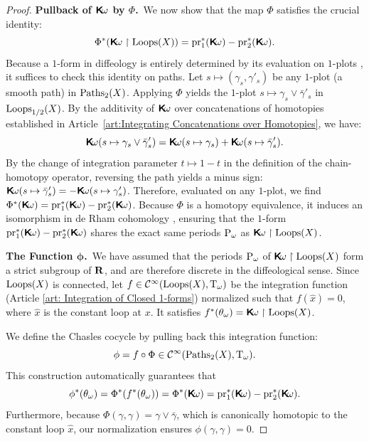 \documentclass[10pt,reqno,letterpaper,twoside]{amsbook}
\begin{document}
\begin{proof}
    \textbf{Pullback of $\boldsymbol{\mathsf{K}}\!\omega$ by $\Phi$.}~We now show that the map $\Phi$ satisfies the crucial identity:
    \[
      \Phi^*(\Komega \restriction \Loops(X)) = \pr_1^*(\Komega) - \pr_2^*(\Komega).
      \]
    Because a $1$-form in diffeology is entirely determined by its evaluation on $1$-plots \cite[]{PIZ13},
    it suffices to check this identity on paths.
    Let $s \mapsto (\gamma_s, \gamma'_s)$ be any $1$-plot (a smooth path) in $\operatorname{Paths}_2(X)$.
    Applying $\Phi$ yields the $1$-plot $s \mapsto \gamma_s \vee \bar\gamma'_s$ in $\operatorname{Loops}_{1/2}(X)$.
    By the additivity of $\boldsymbol{\mathsf{K}}\!\omega$ over concatenations of homotopies established in Article~\ref{art:Integrating Concatenations over Homotopies},
    we have:
    \[
      \boldsymbol{\mathsf{K}}\!\omega(s \mapsto \gamma_s \vee \bar\gamma'_s) = \boldsymbol{\mathsf{K}}\!\omega(s \mapsto \gamma_s) + \boldsymbol{\mathsf{K}}\!\omega(s \mapsto \bar\gamma'_s).
      \]
    By the change of integration parameter $t \mapsto 1-t$ in the definition of the chain-homotopy operator,
    reversing the path yields a minus sign:
    $\boldsymbol{\mathsf{K}}\!\omega(s \mapsto \bar\gamma'_s) = - \boldsymbol{\mathsf{K}}\!\omega(s \mapsto \gamma'_s)$.
    Therefore,
    evaluated on any $1$-plot,
    we find $\Phi^*(\Komega) = \pr_1^*(\Komega) - \pr_2^*(\Komega)$.
    Because $\Phi$ is a homotopy equivalence,
    it induces an isomorphism in de Rham cohomology \cite[]{PIZ13},
    ensuring that the $1$-form $\pr_1^*(\Komega) - \pr_2^*(\Komega)$ shares the exact same periods $\operatorname{P}_\omega$ as $\boldsymbol{\mathsf{K}}\!\omega \restriction \operatorname{Loops}(X)$.
    
    \textbf{The Function $\pmb{\phi}$.}~We have assumed that the periods $\operatorname{P}_\omega$ of $\boldsymbol{\mathsf{K}}\!\omega \restriction \operatorname{Loops}(X)$ form a strict subgroup of ${\mathbf{R}}$,
    and are therefore discrete in the diffeological sense.
    Since $\operatorname{Loops}(X)$ is connected,
    let $f \in {\mathcal{C}}^\infty(\operatorname{Loops}(X),\mathrm{T}_\omega)$ be the integration function (Article \ref{art: Integration of Closed 1-forms}) normalized such that $f(\hat{x}) = 0$,
    where $\hat{x}$ is the constant loop at $x$.
    It satisfies $f^*(\theta_\omega) = \boldsymbol{\mathsf{K}}\!\omega \restriction \operatorname{Loops}(X)$.
    
    We define the Chasles cocycle by pulling back this integration function:
    \[
      \phi = f \circ \Phi \in {\mathcal{C}}^\infty(\operatorname{Paths}_2(X), \mathrm{T}_\omega).
      \]
    This construction automatically guarantees that
    \[
      \phi^*(\theta_\omega) = \Phi^*(f^*(\theta_\omega)) = \Phi^*(\Komega) = \pr_1^*(\Komega) - \pr_2^*(\Komega).
      \]
    Furthermore,
    because $\Phi(\gamma,\gamma) = \gamma \vee \bar\gamma$,
    which is canonically homotopic to the constant loop $\hat{x}$,
    our normalization ensures $\phi(\gamma,\gamma) = 0$.
    

\end{proof}
\end{document}
